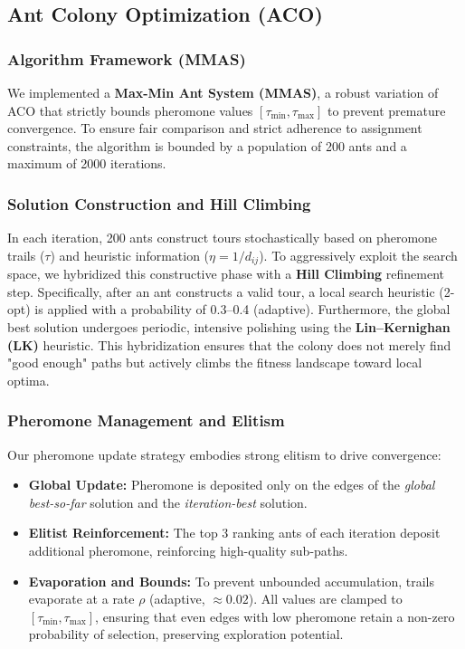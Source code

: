 \documentclass[11pt,a4paper]{article}
\begin{document}
\subsection{Ant Colony Optimization (ACO)}
\subsubsection*{Algorithm Framework (MMAS)}
We implemented a \textbf{Max-Min Ant System (MMAS)}, a robust variation of ACO that strictly bounds pheromone values $[\tau_{\min}, \tau_{\max}]$ to prevent premature convergence. To ensure fair comparison and strict adherence to assignment constraints, the algorithm is bounded by a population of 200 ants and a maximum of 2000 iterations.

\subsubsection*{Solution Construction and Hill Climbing}
In each iteration, 200 ants construct tours stochastically based on pheromone trails ($\tau$) and heuristic information ($\eta = 1/d_{ij}$). To aggressively exploit the search space, we hybridized this constructive phase with a \textbf{Hill Climbing} refinement step. Specifically, after an ant constructs a valid tour, a local search heuristic (2-opt) is applied with a probability of 0.3--0.4 (adaptive). Furthermore, the global best solution undergoes periodic, intensive polishing using the \textbf{Lin--Kernighan (LK)} heuristic. This hybridization ensures that the colony does not merely find "good enough" paths but actively climbs the fitness landscape toward local optima.

\subsubsection*{Pheromone Management and Elitism}
Our pheromone update strategy embodies strong elitism to drive convergence:
\begin{itemize}[nosep]
  \item \textbf{Global Update:} Pheromone is deposited only on the edges of the \textit{global best-so-far} solution and the \textit{iteration-best} solution.
  \item \textbf{Elitist Reinforcement:} The top 3 ranking ants of each iteration deposit additional pheromone, reinforcing high-quality sub-paths.
  \item \textbf{Evaporation and Bounds:} To prevent unbounded accumulation, trails evaporate at a rate $\rho$ (adaptive, $\approx 0.02$). All values are clamped to $[\tau_{\min}, \tau_{\max}]$, ensuring that even edges with low pheromone retain a non-zero probability of selection, preserving exploration potential.
\end{itemize}
\end{document}
